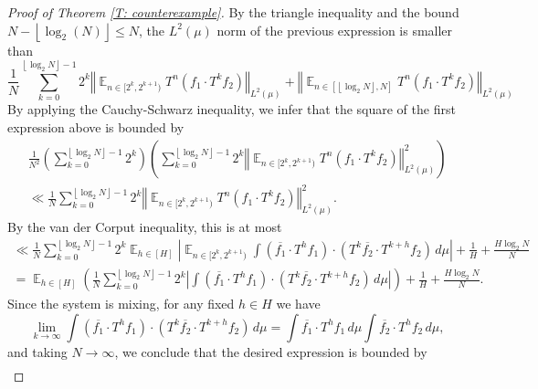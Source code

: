 \documentclass[11pt]{amsart}
\theoremstyle{definition}
\DeclareMathOperator*{\E}{\mathbb{E}}
\newcommand{\norm}[1]{\left\Vert #1\right\Vert}
\newcommand{\1}{{\mathbf{1}}}
\newcommand{\floor}[1]{{\left \lfloor #1 \right \rfloor}}
\begin{document}
\begin{proof}[Proof of Theorem \ref{T: counterexample}]
By the triangle inequality and the bound $N-\floor{\log_2(N)}\leq N$, the $L^2(\mu)$ norm of the previous expression is smaller than \begin{equation*}
    \frac{1}{N}\sum_{k=0}^{\floor{\log_2 N}-1}2^k \norm{\E_{n\in[2^k,2^{k+1})} T^n(f_1\cdot T^{k}f_2)}_{L^2(\mu)} + \norm{\E_{n\in[\floor{\log_2 N}, N]}T^n(f_1\cdot T^{k}f_2)}_{L^2(\mu)}
\end{equation*}
    By applying the Cauchy-Schwarz inequality, we infer that the square of the first expression above is bounded by
    \begin{multline*}
        \frac{1}{N^2}\left(\sum_{k=0}^{\floor{\log_2 N}-1}2^k \right)\left(\sum_{k=0}^{\floor{\log_2 N}-1} 2^k\norm{\E_{n\in[2^k,2^{k+1})} T^n(f_1\cdot T^{k}f_2)}_{L^2(\mu)}^2\right)\\
        \ll \frac{1}{N}\sum_{k=0}^{\floor{\log_2 N}-1} 2^k\norm{\E_{n\in[2^k,2^{k+1})} T^n(f_1\cdot T^{k}f_2)}_{L^2(\mu)}^2.
    \end{multline*}
    By the van der Corput inequality, this is at most 
    \begin{multline*}
       \ll\frac{1}{N}\sum_{k=0}^{\floor{\log_2 N}-1} 2^k\E_{h\in[H]}\left| \E_{n\in[2^k,2^{k+1})}\int(\overline{f_1}\cdot T^h f_1)\cdot (T^k\overline{f_2}\cdot T^{k+h} f_2) \, d\mu\right|+ {\frac{1}{H}+\frac{H\log_2 N}{N}}\\
         =\E_{h\in[H]} \left(\frac{1}{N}\sum_{k=0}^{\floor{\log_2 N}-1}2^k \left|\int (\overline{f_1}\cdot T^h f_1)\cdot (T^k\overline{f_2}\cdot T^{k+h} f_2) \, d\mu\right|\right)+{\frac{1}{H}+\frac{H\log_2 N}{N}}.
    \end{multline*}
    Since the system is mixing, for any fixed $h\in H$ we have
    \begin{equation*}
        \lim\limits_{k\to\infty} \int (\overline{f_1}\cdot T^h f_1)\cdot (T^k\overline{f_2}\cdot T^{k+h} f_2) \, d\mu=\int \overline{f_1}\cdot T^h f_1\, d\mu \int \overline{f_2}\cdot T^h f_2\, d\mu,
    \end{equation*}
    and taking $N\to\infty$, we conclude that the desired expression is bounded by 
    \begin{multline*}

\end{multline*}
\end{proof}
\end{document}
